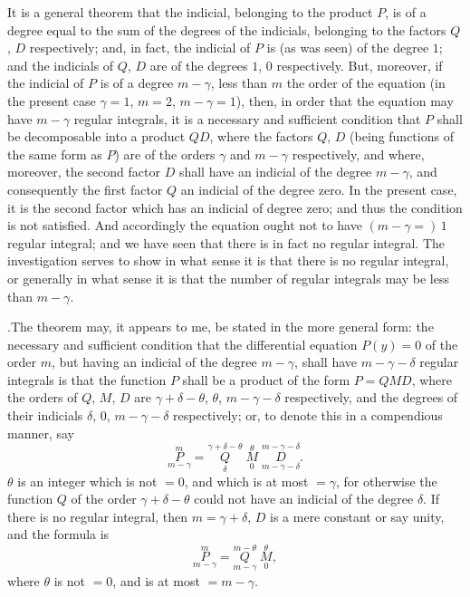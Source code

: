\documentclass[11pt]{article}
\begin{document}
It is a general theorem that the indicial, belonging to the product $P$, is of a degree equal to the sum of the degrees of the indicials, belonging to the factors $Q$, $D$ respectively; and, in fact, the indicial of $P$ is (as was seen) of the degree $1$; and the indicials of $Q$, $D$ are of the degrees $1$, $0$ respectively. But, moreover, if the indicial of $P$ is of a degree $m-\gamma$, less than $m$ the order of the equation (in the present case $\gamma=1$, $m=2$, $m-\gamma=1$), then, in order that the equation may have $m-\gamma$ regular integrals, it is a necessary and sufficient condition that $P$ shall be decomposable into a product $QD$, where the factors $Q$, $D$ (being functions of the same form as $P$) are of the orders $\gamma$ and $m-\gamma$ respectively, and where, moreover, the second factor $D$ shall have an indicial of the degree $m-\gamma$, and consequently the first factor $Q$ an indicial of the degree zero. In the present case, it is the second factor which has an indicial of degree zero; and thus the condition is not satisfied. And accordingly the equation ought not to have $(m-\gamma=)\,1$ regular integral; and we have seen that there is in fact no regular integral. The investigation serves to show in what sense it is that there is no regular integral, or generally in what sense it is that the number of regular integrals may be less than $m-\gamma$.

\medskip

.\quad The theorem may, it appears to me, be stated in the more general form: the necessary and sufficient condition that the differential equation $P(y)=0$ of the order $m$, but having an indicial of the degree $m-\gamma$, shall have $m-\gamma-\delta$ regular integrals is that the function $P$ shall be a product of the form $P = QMD$, where the orders of $Q$, $M$, $D$ are $\gamma+\delta-\theta$, $\theta$, $m-\gamma-\delta$ respectively, and the degrees of their indicials $\delta$, $0$, $m-\gamma-\delta$ respectively; or, to denote this in a compendious manner, say
\[
\overset{m}{\underset{m-\gamma}{P}} = \overset{\gamma+\delta-\theta}{\underset{\delta}{Q}}\;\overset{\theta}{\underset{0}{M}}\;\overset{m-\gamma-\delta}{\underset{m-\gamma-\delta}{D}}.
\]
$\theta$ is an integer which is not $=0$, and which is at most $=\gamma$, for otherwise the function $Q$ of the order $\gamma+\delta-\theta$ could not have an indicial of the degree $\delta$. If there is no regular integral, then $m=\gamma+\delta$, $D$ is a mere constant or say unity, and the formula is
\[
\overset{m}{\underset{m-\gamma}{P}} = \overset{m-\theta}{\underset{m-\gamma}{Q}}\;\overset{\theta}{\underset{0}{M}},
\]
where $\theta$ is not $=0$, and is at most $=m-\gamma$.
\end{document}
